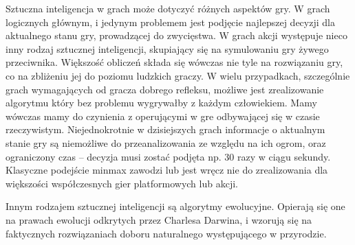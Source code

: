 \begin{par}
Sztuczna inteligencja w grach może dotyczyć różnych aspektów gry. W grach logicznych głównym, i jedynym problemem jest podjęcie najlepszej decyzji dla aktualnego stanu gry, prowadzącej do zwycięstwa. 
W grach akcji występuje nieco inny rodzaj sztucznej inteligencji, skupiający się na symulowaniu gry żywego przeciwnika. 
Większość obliczeń składa się wówczas nie tyle na rozwiązaniu gry, co na zbliżeniu jej do poziomu ludzkich graczy. 
W wielu przypadkach, szczególnie grach wymagających od gracza dobrego refleksu, możliwe jest zrealizowanie algorytmu który bez problemu wygrywałby z każdym człowiekiem.
Mamy wówczas mamy do czynienia z operującymi w gre odbywającej się w czasie rzeczywistym. 
Niejednokrotnie w dzisiejszych grach informacje o aktualnym stanie gry są niemożliwe do przeanalizowania ze względu na ich ogrom, oraz ograniczony czas -- decyzja musi zostać podjęta np. 30 razy w ciągu sekundy. Klasyczne podejście minmax zawodzi lub jest wręcz nie do zrealizowania dla większości współczesnych gier platformowych lub akcji.
\end{par}
\begin{par}
Innym rodzajem sztucznej inteligencji są algorytmy ewolucyjne.
Opierają się one na prawach ewolucji odkrytych przez Charlesa Darwina, i wzorują się na faktycznych rozwiązaniach doboru naturalnego występującego w przyrodzie. 

\end{par}
